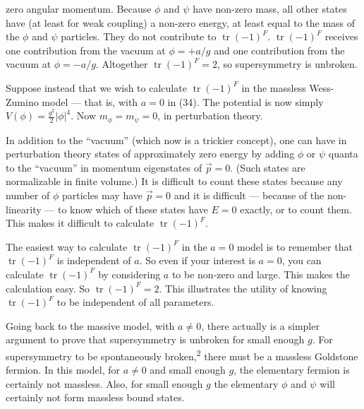 
zero angular momentum. Because $\phi$ and $\psi$ have non-zero mass, all
other states have (at least for weak coupling) a non-zero energy,
at least equal to the mass of the $\phi$ and $\psi$ particles. They do not
contribute to $\operatorname{tr}(-1)^F$. $\operatorname{tr}(-1)^F$ receives one contribution from the
vacuum at $\phi = +a/g$ and one contribution from the vacuum at $\phi = -a/g$.
Altogether $\operatorname{tr}(-1)^F = 2$, so supersymmetry is unbroken.

Suppose instead that we wish to calculate $\operatorname{tr}(-1)^F$ in the massless
Wess-Zumino model --- that is, with $a = 0$ in (34). The potential
is now simply $V(\phi) = \frac{g^2}{2} |\phi|^4$. Now $m_\phi = m_\psi = 0$, in perturbation theory.

In addition to the ``vacuum'' (which now is a trickier concept), one
can have in perturbation theory states of approximately zero energy
by adding $\phi$ or $\psi$ quanta to the ``vacuum'' in momentum eigenstates of
$\vec p = 0$. (Such states are normalizable in finite volume.) It is difficult
to count these states because any number of $\phi$ particles may
have $\vec p = 0$ and it is difficult --- because of the non-linearity ---
to know which of these states have $E = 0$ exactly, or to count them.
This makes it difficult to calculate $\operatorname{tr}(-1)^F$.

The easiest way to calculate $\operatorname{tr}(-1)^F$ in the $a = 0$ model is to
remember that $\operatorname{tr}(-1)^F$ is independent of $a$. So even if your interest
is $a = 0$, you can calculate $\operatorname{tr}(-1)^F$ by considering $a$ to be non-zero
and large. This makes the calculation easy. So $\operatorname{tr}(-1)^F = 2$. This
illustrates the utility of knowing $\operatorname{tr}(-1)^F$ to be independent of all
parameters.

Going back to the massive model, with $a \neq 0$, there actually is
a simpler argument to prove that supersymmetry is unbroken for small
enough $g$. For supersymmetry to be spontaneously broken,\textsuperscript{2} there
must be a massless Goldstone fermion. In this model, for $a \neq 0$ and
small enough $g$, the elementary fermion is certainly not massless.
Also, for small enough $g$ the elementary $\phi$ and $\psi$ will certainly not
form massless bound states.

